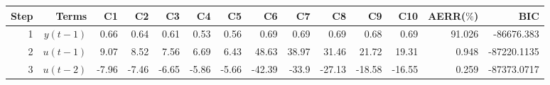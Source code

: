 \begin{tabular}{rrrrrrrrrrrrrr}
Step & Terms & C1 & C2 & C3 & C4 & C5 & C6 & C7 & C8 & C9 & C10 & AERR($\%$) & BIC \\ 
\hline 
1 & $y(t-1)$ & 0.66 & 0.64 & 0.61 & 0.53 & 0.56 & 0.69 & 0.69 & 0.69 & 0.68 & 0.69 & 91.026 & -86676.383 \\ 
2 & $u(t-1)$ & 9.07 & 8.52 & 7.56 & 6.69 & 6.43 & 48.63 & 38.97 & 31.46 & 21.72 & 19.31 & 0.948 & -87220.1135 \\ 
3 & $u(t-2)$ & -7.96 & -7.46 & -6.65 & -5.86 & -5.66 & -42.39 & -33.9 & -27.13 & -18.58 & -16.55 & 0.259 & -87373.0717 \\ 
\hline 
\end{tabular}
